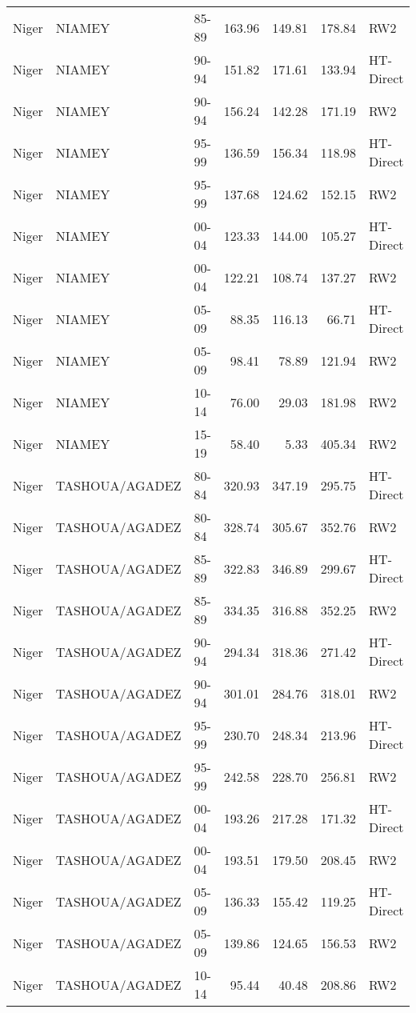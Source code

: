 \begin{longtable}{lllrrrl}
  Niger & NIAMEY & 85-89 & 163.96 & 149.81 & 178.84 & RW2 \\ 
  Niger & NIAMEY & 90-94 & 151.82 & 171.61 & 133.94 & HT-Direct \\ 
  Niger & NIAMEY & 90-94 & 156.24 & 142.28 & 171.19 & RW2 \\ 
  Niger & NIAMEY & 95-99 & 136.59 & 156.34 & 118.98 & HT-Direct \\ 
  Niger & NIAMEY & 95-99 & 137.68 & 124.62 & 152.15 & RW2 \\ 
  Niger & NIAMEY & 00-04 & 123.33 & 144.00 & 105.27 & HT-Direct \\ 
  Niger & NIAMEY & 00-04 & 122.21 & 108.74 & 137.27 & RW2 \\ 
  Niger & NIAMEY & 05-09 & 88.35 & 116.13 & 66.71 & HT-Direct \\ 
  Niger & NIAMEY & 05-09 & 98.41 & 78.89 & 121.94 & RW2 \\ 
  Niger & NIAMEY & 10-14 & 76.00 & 29.03 & 181.98 & RW2 \\ 
  Niger & NIAMEY & 15-19 & 58.40 & 5.33 & 405.34 & RW2 \\ 
  Niger & TASHOUA/AGADEZ & 80-84 & 320.93 & 347.19 & 295.75 & HT-Direct \\ 
  Niger & TASHOUA/AGADEZ & 80-84 & 328.74 & 305.67 & 352.76 & RW2 \\ 
  Niger & TASHOUA/AGADEZ & 85-89 & 322.83 & 346.89 & 299.67 & HT-Direct \\ 
  Niger & TASHOUA/AGADEZ & 85-89 & 334.35 & 316.88 & 352.25 & RW2 \\ 
  Niger & TASHOUA/AGADEZ & 90-94 & 294.34 & 318.36 & 271.42 & HT-Direct \\ 
  Niger & TASHOUA/AGADEZ & 90-94 & 301.01 & 284.76 & 318.01 & RW2 \\ 
  Niger & TASHOUA/AGADEZ & 95-99 & 230.70 & 248.34 & 213.96 & HT-Direct \\ 
  Niger & TASHOUA/AGADEZ & 95-99 & 242.58 & 228.70 & 256.81 & RW2 \\ 
  Niger & TASHOUA/AGADEZ & 00-04 & 193.26 & 217.28 & 171.32 & HT-Direct \\ 
  Niger & TASHOUA/AGADEZ & 00-04 & 193.51 & 179.50 & 208.45 & RW2 \\ 
  Niger & TASHOUA/AGADEZ & 05-09 & 136.33 & 155.42 & 119.25 & HT-Direct \\ 
  Niger & TASHOUA/AGADEZ & 05-09 & 139.86 & 124.65 & 156.53 & RW2 \\ 
  Niger & TASHOUA/AGADEZ & 10-14 & 95.44 & 40.48 & 208.86 & RW2 \\ 

\end{longtable}
